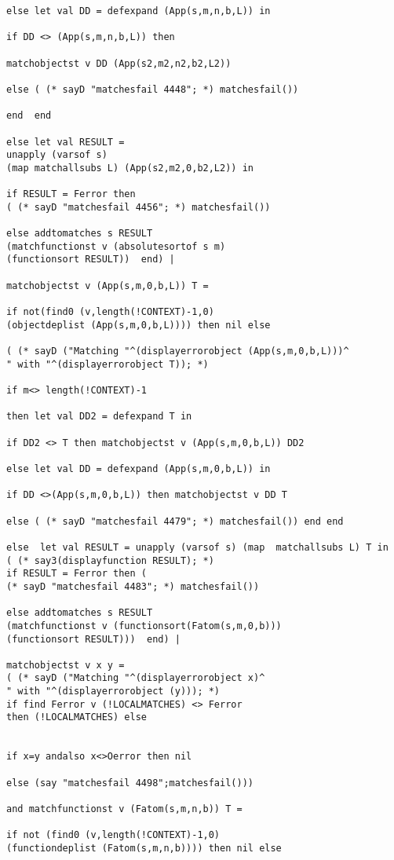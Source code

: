 \documentclass[12pt]{article}
\begin{document}
\begin{verbatim}
else let val DD = defexpand (App(s,m,n,b,L)) in

if DD <> (App(s,m,n,b,L)) then

matchobjectst v DD (App(s2,m2,n2,b2,L2)) 

else ( (* sayD "matchesfail 4448"; *) matchesfail())

end  end

else let val RESULT = 
unapply (varsof s) 
(map matchallsubs L) (App(s2,m2,0,b2,L2)) in

if RESULT = Ferror then 
( (* sayD "matchesfail 4456"; *) matchesfail())

else addtomatches s RESULT 
(matchfunctionst v (absolutesortof s m) 
(functionsort RESULT))  end) |

matchobjectst v (App(s,m,0,b,L)) T =

if not(find0 (v,length(!CONTEXT)-1,0) 
(objectdeplist (App(s,m,0,b,L)))) then nil else

( (* sayD ("Matching "^(displayerrorobject (App(s,m,0,b,L)))^
" with "^(displayerrorobject T)); *)

if m<> length(!CONTEXT)-1 

then let val DD2 = defexpand T in

if DD2 <> T then matchobjectst v (App(s,m,0,b,L)) DD2

else let val DD = defexpand (App(s,m,0,b,L)) in

if DD <>(App(s,m,0,b,L)) then matchobjectst v DD T

else ( (* sayD "matchesfail 4479"; *) matchesfail()) end end

else  let val RESULT = unapply (varsof s) (map  matchallsubs L) T in
( (* say3(displayfunction RESULT); *)
if RESULT = Ferror then ( 
(* sayD "matchesfail 4483"; *) matchesfail())

else addtomatches s RESULT 
(matchfunctionst v (functionsort(Fatom(s,m,0,b))) 
(functionsort RESULT)))  end) |

matchobjectst v x y = 
( (* sayD ("Matching "^(displayerrorobject x)^
" with "^(displayerrorobject (y))); *)
if find Ferror v (!LOCALMATCHES) <> Ferror 
then (!LOCALMATCHES) else


if x=y andalso x<>Oerror then nil 

else (say "matchesfail 4498";matchesfail()))

and matchfunctionst v (Fatom(s,m,n,b)) T =

if not (find0 (v,length(!CONTEXT)-1,0) 
(functiondeplist (Fatom(s,m,n,b)))) then nil else


\end{verbatim}
\end{document}

